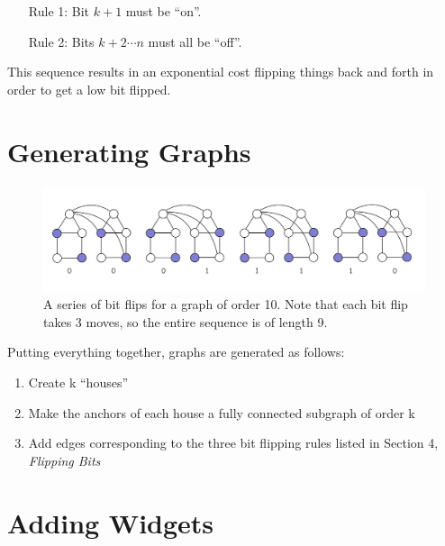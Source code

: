 \documentclass{article}
\begin{document}
\begin{enumerate}
\item [Rule 1: ] Bit $k+1$ must be ``on''.
\item [Rule 2: ] Bits $k+2 \cdots n$ must all be ``off''.
\end{enumerate}

This sequence results in an exponential cost flipping things back and forth in order to get a low bit flipped.

\section{Generating Graphs}

\begin{figure}[ht]
\centering
\includegraphics[width=1.0\textwidth]{generating-graphs.jpg}
\caption{\label{fig:generating-graphs}A series of bit flips for a graph of order 10. Note that each bit flip takes 3 moves, so the entire sequence is of length 9.}
\end{figure}

Putting everything together, graphs are generated as follows:

\begin{enumerate}
\item Create k ``houses''
\item Make the anchors of each house a fully connected subgraph of order k
\item Add edges corresponding to the three bit flipping rules listed in Section 4, \textit{Flipping Bits}
\end{enumerate}


\section{Adding Widgets}
\end{document}
